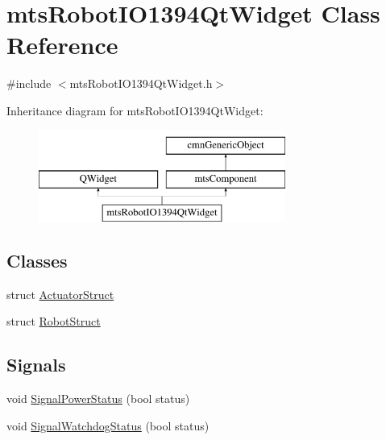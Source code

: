 \hypertarget{classmts_robot_i_o1394_qt_widget}{\section{mts\-Robot\-I\-O1394\-Qt\-Widget Class Reference}
\label{classmts_robot_i_o1394_qt_widget}
}


{\ttfamily \#include $<$mts\-Robot\-I\-O1394\-Qt\-Widget.\-h$>$}

Inheritance diagram for mts\-Robot\-I\-O1394\-Qt\-Widget\-:\begin{figure}[H]
\begin{center}
\leavevmode
\includegraphics[height=3.000000cm]{d5/d80/classmts_robot_i_o1394_qt_widget}
\end{center}
\end{figure}
\subsection*{Classes}
\begin{DoxyCompactItemize}
\item 
struct \hyperlink{structmts_robot_i_o1394_qt_widget_1_1_actuator_struct}{Actuator\-Struct}
\item 
struct \hyperlink{structmts_robot_i_o1394_qt_widget_1_1_robot_struct}{Robot\-Struct}
\end{DoxyCompactItemize}
\subsection*{Signals}
\begin{DoxyCompactItemize}
\item 
void \hyperlink{classmts_robot_i_o1394_qt_widget_aa67b0d5f0d3ba1ea6ae470d669181d6e}{Signal\-Power\-Status} (bool status)
\item 
void \hyperlink{classmts_robot_i_o1394_qt_widget_a2653466bf8a851e95fe47930f2b88aab}{Signal\-Watchdog\-Status} (bool status)
\end{DoxyCompactItemize}
